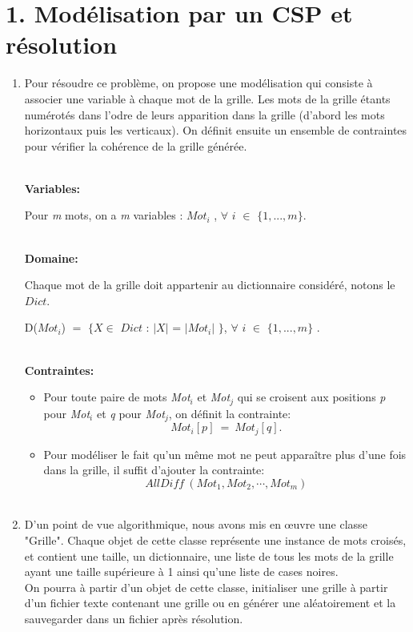 \documentclass[a4paper,12pt]{report}
\begin{document}
\section*{1. Modélisation par un CSP et résolution}
\begin{enumerate}
\item Pour résoudre ce problème, on propose une modélisation qui consiste à associer une variable à chaque mot de la grille. Les mots de la grille étants numérotés dans l'odre de leurs apparition dans la grille (d'abord les mots horizontaux puis les verticaux). On définit ensuite un ensemble de contraintes pour vérifier la cohérence de la grille générée.

~~\\
\textbf{Variables:}


Pour \textit{m} mots, on a \textit{m} variables : \textit{$Mot_i$} , $\forall$ $i$  $\in$ $\{1, ... , m \}$.

~~\\
\textbf{Domaine:}


Chaque mot de la grille doit appartenir au dictionnaire considéré, notons le $Dict$.
\begin{center}
D(\textit{$Mot_i$}) $=$ $\{ X \in$ $Dict$  : $|X|$ = $|Mot_i|$ $\}$, $\forall$  $i$ $\in$ $\{1, ... , m \}$ .
\end{center}

~~\\
\textbf{Contraintes:}\\
\begin{itemize}
\item Pour toute paire de mots \textit{Mot$_i$} et \textit{Mot$_j$} qui se croisent aux positions \textit{p} pour \textit{Mot$_i$} et \textit{q} pour \textit{Mot$_j$}, on définit la contrainte:
$$\textit{Mot}_i [p]\ =\  \textit{Mot}_j [q] .$$ 

\item Pour modéliser le fait qu'un même mot ne peut apparaître plus d'une fois dans la grille, il suffit d'ajouter la contrainte:
$$ \textit{AllDiff}\ (\textit{Mot}_1, \textit{Mot}_2, \cdots , \textit{Mot}_m)  $$\\
\end{itemize}

\item D'un point de vue algorithmique, nous avons mis en œuvre une classe "Grille". Chaque objet de cette classe représente une instance de mots croisés, et contient une taille, un dictionnaire, une liste de tous les mots de la grille ayant une taille supérieure à 1 ainsi qu'une liste de cases noires.\\
On pourra à partir d'un objet de cette classe, initialiser une grille à partir d'un fichier texte contenant une grille ou en générer une aléatoirement et la sauvegarder dans un fichier après résolution.\\


\end{enumerate}
\end{document}
